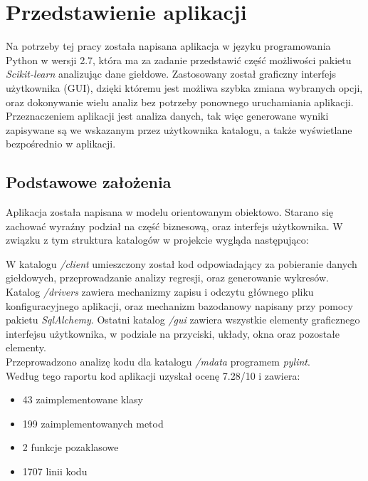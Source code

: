 
\chapter{Przedstawienie aplikacji}
Na potrzeby tej pracy została napisana aplikacja w języku programowania Python w wersji 2.7, która ma za zadanie przedstawić część możliwości pakietu \textit{Scikit-learn} analizując dane giełdowe.
Zastosowany został graficzny interfejs użytkownika (GUI), dzięki któremu jest możliwa szybka zmiana wybranych opcji, oraz dokonywanie wielu analiz bez potrzeby ponownego uruchamiania aplikacji.
Przeznaczeniem aplikacji jest analiza danych, tak więc generowane wyniki zapisywane są we wskazanym przez użytkownika katalogu, a także wyświetlane bezpośrednio w aplikacji.

\section{Podstawowe założenia}
Aplikacja została napisana w modelu orientowanym obiektowo. Starano się zachować wyraźny podział na część biznesową, oraz interfejs użytkownika. W związku z tym struktura katalogów w projekcie wygląda następująco:

W katalogu \textit{/client} umieszczony został kod odpowiadający za pobieranie danych giełdowych, przeprowadzanie analizy regresji, oraz generowanie wykresów.
Katalog \textit{/drivers} zawiera mechanizmy zapisu i odczytu głównego pliku konfiguracyjnego aplikacji, oraz mechanizm bazodanowy napisany przy pomocy pakietu \textit{SqlAlchemy}.
Ostatni katalog \textit{/gui} zawiera wszystkie elementy graficznego interfejsu użytkownika, w podziale na przyciski, układy, okna oraz pozostałe elementy.\\

Przeprowadzono analizę kodu dla katalogu \textit{/mdata} programem \textit{pylint}.\\
Według tego raportu kod aplikacji uzyskał ocenę 7.28/10 i zawiera:
\begin{itemize}
 \item 43 zaimplementowane klasy
 \item 199 zaimplementowanych metod
 \item 2 funkcje pozaklasowe
 \item 1707 linii kodu
\end{itemize}



